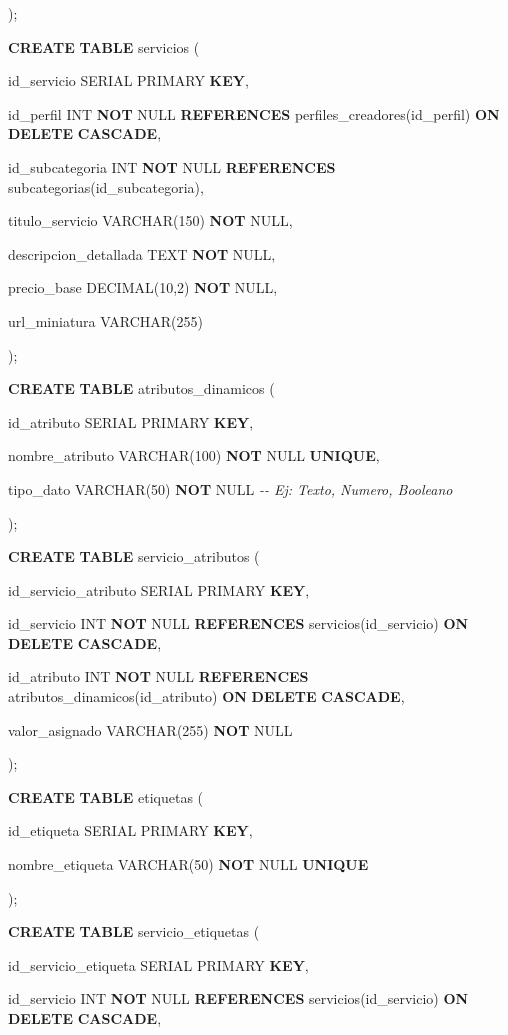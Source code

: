 \documentclass[
]{article}
\begin{document}
);

\textbf{CREATE} \textbf{TABLE} servicios (

id\_servicio SERIAL PRIMARY \textbf{KEY},

id\_perfil INT \textbf{NOT} NULL \textbf{REFERENCES}
perfiles\_creadores(id\_perfil) \textbf{ON} \textbf{DELETE}
\textbf{CASCADE},

id\_subcategoria INT \textbf{NOT} NULL \textbf{REFERENCES}
subcategorias(id\_subcategoria),

titulo\_servicio VARCHAR(150) \textbf{NOT} NULL,

descripcion\_detallada TEXT \textbf{NOT} NULL,

precio\_base DECIMAL(10,2) \textbf{NOT} NULL,

url\_miniatura VARCHAR(255)

);

\textbf{CREATE} \textbf{TABLE} atributos\_dinamicos (

id\_atributo SERIAL PRIMARY \textbf{KEY},

nombre\_atributo VARCHAR(100) \textbf{NOT} NULL \textbf{UNIQUE},

tipo\_dato VARCHAR(50) \textbf{NOT} NULL \emph{-\/- Ej: Texto, Numero,
Booleano}

);

\textbf{CREATE} \textbf{TABLE} servicio\_atributos (

id\_servicio\_atributo SERIAL PRIMARY \textbf{KEY},

id\_servicio INT \textbf{NOT} NULL \textbf{REFERENCES}
servicios(id\_servicio) \textbf{ON} \textbf{DELETE} \textbf{CASCADE},

id\_atributo INT \textbf{NOT} NULL \textbf{REFERENCES}
atributos\_dinamicos(id\_atributo) \textbf{ON} \textbf{DELETE}
\textbf{CASCADE},

valor\_asignado VARCHAR(255) \textbf{NOT} NULL

);

\textbf{CREATE} \textbf{TABLE} etiquetas (

id\_etiqueta SERIAL PRIMARY \textbf{KEY},

nombre\_etiqueta VARCHAR(50) \textbf{NOT} NULL \textbf{UNIQUE}

);

\textbf{CREATE} \textbf{TABLE} servicio\_etiquetas (

id\_servicio\_etiqueta SERIAL PRIMARY \textbf{KEY},

id\_servicio INT \textbf{NOT} NULL \textbf{REFERENCES}
servicios(id\_servicio) \textbf{ON} \textbf{DELETE} \textbf{CASCADE},
\end{document}
